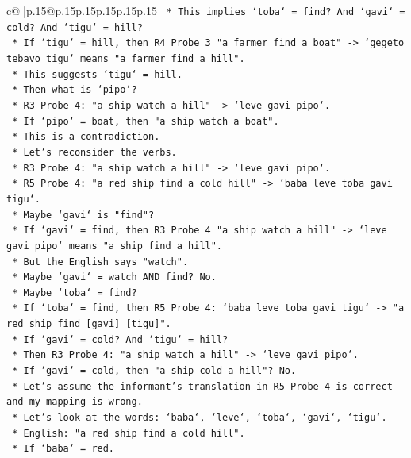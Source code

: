 \documentclass{article}
\begin{document}
{\begin{supertabular}{c@{$\;$}|p{.15\linewidth}@{}p{.15\linewidth}p{.15\linewidth}p{.15\linewidth}p{.15\linewidth}p{.15\linewidth}}
{{{\texttt{        *   This implies `toba` = find? And `gavi` = cold? And `tigu` = hill?} \\
\texttt{        *   If `tigu` = hill, then R4 Probe 3 "a farmer find a boat" {-}> `gegeto tebavo tigu` means "a farmer find a hill".} \\
\texttt{        *   This suggests `tigu` = hill.} \\
\texttt{        *   Then what is `pipo`?} \\
\texttt{        *   R3 Probe 4: "a ship watch a hill" {-}> `leve gavi pipo`.} \\
\texttt{        *   If `pipo` = boat, then "a ship watch a boat".} \\
\texttt{        *   This is a contradiction.} \\
\texttt{        *   Let's reconsider the verbs.} \\
\texttt{        *   R3 Probe 4: "a ship watch a hill" {-}> `leve gavi pipo`.} \\
\texttt{        *   R5 Probe 4: "a red ship find a cold hill" {-}> `baba leve toba gavi tigu`.} \\
\texttt{        *   Maybe `gavi` is "find"?} \\
\texttt{        *   If `gavi` = find, then R3 Probe 4 "a ship watch a hill" {-}> `leve gavi pipo` means "a ship find a hill".} \\
\texttt{        *   But the English says "watch".} \\
\texttt{        *   Maybe `gavi` = watch AND find? No.} \\
\texttt{        *   Maybe `toba` = find?} \\
\texttt{        *   If `toba` = find, then R5 Probe 4: `baba leve toba gavi tigu` {-}> "a red ship find {[}gavi{]} {[}tigu{]}".} \\
\texttt{        *   If `gavi` = cold? And `tigu` = hill?} \\
\texttt{        *   Then R3 Probe 4: "a ship watch a hill" {-}> `leve gavi pipo`.} \\
\texttt{        *   If `gavi` = cold, then "a ship cold a hill"? No.} \\
\texttt{        *   Let's assume the informant's translation in R5 Probe 4 is correct and my mapping is wrong.} \\
\texttt{        *   Let's look at the words: `baba`, `leve`, `toba`, `gavi`, `tigu`.} \\
\texttt{        *   English: "a red ship find a cold hill".} \\
\texttt{        *   If `baba` = red.} \\
}}}
\end{supertabular}}
\end{document}
